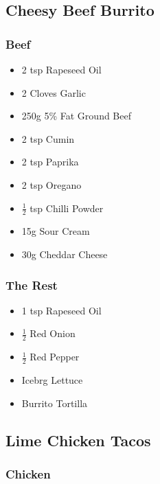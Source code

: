 \documentclass[11pt, english]{article}
\begin{document}
\newpage

	\subsection{Cheesy Beef Burrito}

		\subsubsection*{Beef}

	\begin{itemize}
        \setlength\itemsep{0cm}
                \item 2 tsp Rapeseed Oil
		\item 2 Cloves Garlic
		\item 250g 5\% Fat Ground Beef
		\item 2 tsp Cumin
		\item 2 tsp Paprika
		\item 2 tsp Oregano
		\item $\frac{1}{2}$ tsp Chilli Powder
		\item 15g Sour Cream
		\item 30g Cheddar Cheese
        \end{itemize}

		\subsubsection*{The Rest}

	\begin{itemize}
        \setlength\itemsep{0cm}
                \item 1 tsp Rapeseed Oil
		\item $\frac{1}{2}$ Red Onion
		\item $\frac{1}{2}$ Red Pepper
		\item Icebrg Lettuce
		\item Burrito Tortilla
        \end{itemize}

\newpage

	\subsection{Lime Chicken Tacos}

		\subsubsection*{Chicken}
\end{document}
